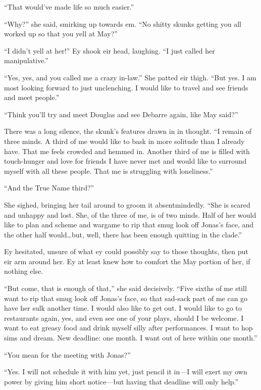 ``That would've made life so much easier.''

``Why?'' she said, smirking up towards em. ``No shitty skunks getting you all worked up so that you yell at May?''

``I didn't yell at her!'' Ey shook eir head, laughing. ``I just called her manipulative.''

``Yes, yes, and you called me a crazy in-law.'' She patted eir thigh. ``But yes. I am most looking forward to just unclenching. I would like to travel and see friends and meet people.''

``Think you'll try and meet Douglas and see Debarre again, like May said?''

There was a long silence, the skunk's features drawn in in thought. ``I remain of three minds. A third of me would like to bask in more solitude than I already have. That me feels crowded and hemmed in. Another third of me is filled with touch-hunger and love for friends I have never met and would like to surround myself with all these people. That me is struggling with loneliness.''

``And the True Name third?''

She sighed, bringing her tail around to groom it absentmindedly. ``She is scared and unhappy and lost. She, of the three of me, is of two minds. Half of her would like to plan and scheme and wargame to rip that smug look off Jonas's face, and the other half would\ldots but, well, there has been enough quitting in the clade.''

Ey hesitated, unsure of what ey could possibly say to those thoughts, then put eir arm around her. Ey at least knew how to comfort the May portion of her, if nothing else.

``But come, that is enough of that,'' she said decisively. ``Five sixths of me still want to rip that smug look off Jonas's face, so that sad-sack part of me can go have her sulk another time. I would also like to get out. I would like to go to restaurants again, yes, and even see one of your plays, should I be welcome. I want to eat greasy food and drink myself silly after performances. I want to hop sims and dream. New deadline: one month. I want out of here within one month.''

``You mean for the meeting with Jonas?''

``Yes. I will not schedule it with him yet, just pencil it in—I will exert my own power by giving him short notice—but having that deadline will only help.''

